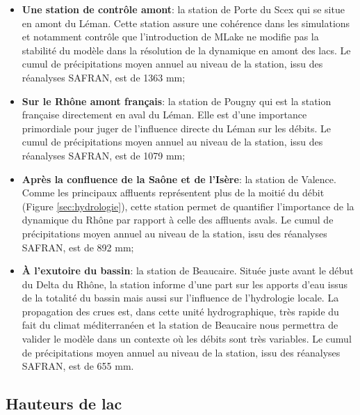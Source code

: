 \begin{itemize}
\item \textbf{Une station de contrôle amont}: la station de Porte du Scex qui se situe en amont du Léman. Cette station assure une cohérence dans les simulations et notamment contrôle que l'introduction de MLake ne modifie pas la stabilité du modèle dans la résolution de la dynamique en amont des lacs. Le cumul de précipitations moyen annuel au niveau de la station, issu des réanalyses SAFRAN, est de 1363 mm;\\

\item \textbf{Sur le Rhône amont français}: la station de Pougny qui est la station française directement en aval du Léman. Elle est d'une importance primordiale pour juger de l'influence directe du Léman sur les débits. Le cumul de précipitations moyen annuel au niveau de la station, issu des réanalyses SAFRAN, est de 1079 mm;\\

\item \textbf{Après la confluence de la Saône et de l'Isère}: la station de Valence. Comme les principaux affluents représentent plus de la moitié du débit (Figure \ref{sec:hydrologie}), cette station permet de quantifier l'importance de la dynamique du Rhône par rapport à celle des affluents avals. Le cumul de précipitations moyen annuel au niveau de la station, issu des réanalyses SAFRAN, est de 892 mm; \\

\item \textbf{À l'exutoire du bassin}: la station de Beaucaire. Située juste avant le début du Delta du Rhône, la station informe d'une part sur les apports d'eau issus de la totalité du bassin mais aussi sur l'influence de l'hydrologie locale. La propagation des crues est, dans cette unité hydrographique, très rapide du fait du climat méditerranéen et la station de Beaucaire nous permettra de valider le modèle dans un contexte où les débits sont très variables. Le cumul de précipitations moyen annuel au niveau de la station, issu des réanalyses SAFRAN, est de 655 mm.
\end{itemize}

\subsection*{{\selectfont Hauteurs de lac}}

